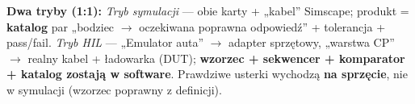 \documentclass[11pt]{article}
\newcommand{\ra}{$\rightarrow$}
\newcommand{\key}[1]{\textbf{\color{navy}#1}}
\begin{document}
\key{Dwa tryby (1:1):} \emph{Tryb symulacji} --- obie karty + „kabel'' Simscape; produkt = \key{katalog} par „bodziec \ra{} oczekiwana poprawna odpowiedź'' + tolerancja + pass/fail. \emph{Tryb HIL} --- „Emulator auta'' \ra{} adapter sprzętowy, „warstwa CP'' \ra{} realny kabel + ładowarka (DUT); \key{wzorzec + sekwencer + komparator + katalog zostają w software}. Prawdziwe usterki wychodzą \key{na sprzęcie}, nie w symulacji (wzorzec poprawny z definicji).
\end{document}
